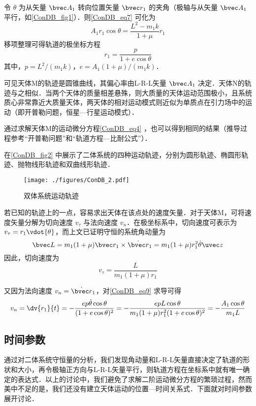 令 $\theta$ 为从矢量 $\bvec A_1$ 转向位置矢量 $\bvec r_1$ 的夹角（极轴与从矢量 $\bvec A_1$ 平行，如\autoref{ConDB_fig1}）．则\autoref{ConDB_eq7} 可化为
\begin{equation}
A_1r_1\cos\theta = \frac{L^2-m_1k}{1+\mu}r_1
\end{equation}
移项整理可得轨道的极坐标方程
\begin{equation}\label{ConDB_eq9}
r_1=\frac{p}{1+e \cos\theta}
\end{equation}
其中，$p=L^2/(m_1k)$，$e=A_1(1+\mu)/(m_1k)$．

可见天体M的轨迹是圆锥曲线，其偏心率由L-R-L矢量 $\bvec A_1$ 决定．天体N的轨迹与之相似．当两个天体的质量相差悬殊，则大质量的天体运动范围极小，且系统质心非常靠近大质量天体，两天体的相对运动模式则近似为单质点在引力场中的运动（即开普勒问题，恒星—行星运动模式）．

通过求解天体M的运动微分方程\autoref{ConDB_eq4} ，也可以得到相同的结果（推导过程参考“开普勒问题”和“轨道方程—比耐公式”）．

在\autoref{ConDB_fig2} 中展示了二体系统的四种运动轨迹，分别为圆形轨迹、椭圆形轨迹、抛物线形轨迹和双曲线形轨迹．
\begin{figure}[ht]
\centering
\texttt{[image: ./figures/ConDB\_2.pdf]}
\caption{双体系统运动轨迹} \label{ConDB_fig2}
\end{figure}

若已知的轨迹上的一点，容易求出天体在该点处的速度矢量．对于天体M，可将速度矢量分解为切向速度 $v_\tau$ 与法向速度 $v_n$．在极坐标系中，切向速度可表示为 $v_\tau =r_1\vdot{\theta}$，而上文已证明守恒的系统角动量为
\begin{equation}\label{ConDB_eq10}
\bvec L  = m_1(1+\mu)\bvec r_1 \times \dot{\bvec r}_1= m_1(1+\mu)r_1^2\dot{\theta}\uvec z
\end{equation}
因此，切向速度为
\begin{equation}
v_\tau =\frac{L}{m_1(1+\mu)r_1}
\end{equation}

又因为法向速度 $v_n=\dot{\bvec r}_1$，对\autoref{ConDB_eq9} 求导可得
\begin{equation}
v_n =\dv{r_1}{t}=-\frac{ep\dot{\theta}\cos\theta}{(1+e\cos\theta)^2}=-\frac{epL\cos\theta}{m_1(1+\mu)r_1^2(1+e\cos\theta)^2}=-\frac{A_1\cos\theta}{m_1L}
\end{equation}

\subsection{时间参数}
通过对二体系统守恒量的分析，我们发现角动量和L-R-L矢量直接决定了轨道的形状和大小，再令极轴正方向与L-R-L矢量平行，则轨道方程在坐标系中就有唯一确定的表达式．以上的讨论中，我们避免了求解二阶运动微分方程的繁琐过程，然而美中不足的是，我们还没有建立天体运动的位置—时间关系式．下面就对时间参数展开讨论．

